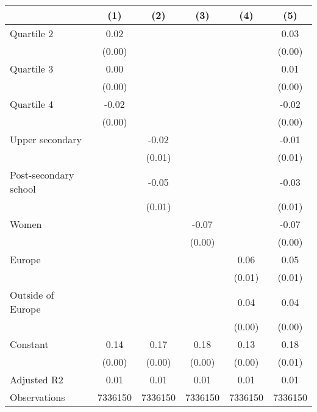 
\begin{tabular}{@{}l*{5}{S[table-format={-}2.2{\tnote{***}}]}@{}}
\toprule
{} & {(1)} & {(2)} & {(3)} & {(4)} & {(5)}\tabularnewline%
\midrule
Quartile 2 & 0.02\tnote{***} &  &  &  & 0.03\tnote{***}\tabularnewline%
 & (0.00) &  &  &  & \vphantom{2} (0.00)\tabularnewline%
Quartile 3 & 0.00 &  &  &  & 0.01\tnote{**}\tabularnewline%
 & (0.00) &  &  &  & \vphantom{1} (0.00)\tabularnewline%
Quartile 4 & -0.02\tnote{***} &  &  &  & -0.02\tnote{***}\tabularnewline%
 & (0.00) &  &  &  & (0.00)\tabularnewline%
Upper secondary &  & -0.02\tnote{***} &  &  & -0.01\tnote{*}\tabularnewline%
 &  & (0.01) &  &  & \vphantom{1} (0.01)\tabularnewline%
Post-secondary school &  & -0.05\tnote{***} &  &  & -0.03\tnote{***}\tabularnewline%
 &  & (0.01) &  &  & (0.01)\tabularnewline%
Women &  &  & -0.07\tnote{***} &  & -0.07\tnote{***}\tabularnewline%
 &  &  & (0.00) &  & (0.00)\tabularnewline%
Europe &  &  &  & 0.06\tnote{***} & 0.05\tnote{***}\tabularnewline%
 &  &  &  & (0.01) & (0.01)\tabularnewline%
Outside of Europe &  &  &  & 0.04\tnote{***} & 0.04\tnote{***}\tabularnewline%
 &  &  &  & (0.00) & (0.00)\tabularnewline%
Constant & 0.14\tnote{***} & 0.17\tnote{***} & 0.18\tnote{***} & 0.13\tnote{***} & 0.18\tnote{***}\tabularnewline%
 & (0.00) & (0.00) & (0.00) & (0.00) & (0.01)\tabularnewline%
\midrule
Adjusted R2 & 0.01 & 0.01 & 0.01 & 0.01 & 0.01\tabularnewline%
Observations & {\num{7336150}} & {\num{7336150}} & {\num{7336150}} & {\num{7336150}} & {\num{7336150}}\tabularnewline%
\bottomrule
\end{tabular}
